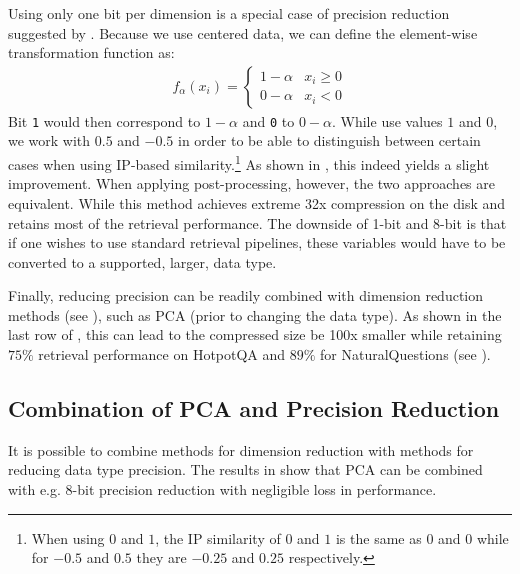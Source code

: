 Using only one bit per dimension is a special case of precision reduction suggested by \citet{yamada2021efficient}.
Because we use centered data, we can define the element-wise transformation function as:
\begin{gather*}
f_\alpha(x_i) = \begin{cases}
1 - \alpha & x_i \ge 0 \\
0 -\alpha & x_i < 0
\end{cases}
\end{gather*}
Bit \texttt{1} would then correspond to $1-\alpha$ and \texttt{0} to $0-\alpha$.
While \citet{yamada2021efficient} use values $1$ and $0$, we work with $0.5$ and $-0.5$ in order to be able to distinguish between certain cases when using IP-based similarity.\footnote{When using $0$ and $1$, the IP similarity of $0$ and $1$ is the same as $0$ and $0$ while for $-0.5$ and $0.5$ they are $-0.25$ and $0.25$ respectively.}
As shown in , this indeed yields a slight improvement.
When applying post-processing, however, the two approaches are equivalent. While this method achieves extreme 32x compression on the disk and retains most of the retrieval performance.
The downside of 1-bit and 8-bit is that if one wishes to use standard retrieval pipelines, these variables would have to be converted to a supported, larger, data type.

Finally, reducing precision can be readily combined with dimension reduction methods (see ), such as PCA (prior to changing the data type).
As shown in the last row of , this can lead to the compressed size be 100x smaller while retaining $75\%$ retrieval performance on HotpotQA and $89\%$ for NaturalQuestions (see ).

\subsection{Combination of PCA and Precision Reduction} \label{subsubsec:prec_pca_mult}

It is possible to combine methods for dimension reduction with methods for reducing data type precision.
The results in  show that PCA can be combined with e.g. 8-bit precision reduction with negligible loss in performance.

